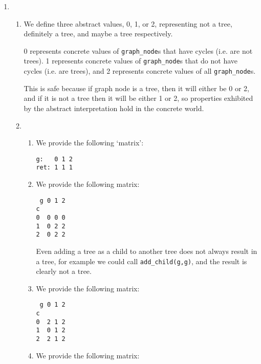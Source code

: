 


\begin{enumerate}[label=(\alph*)]

  \item
    \begin{enumerate}[label=(\roman*)]

      \item
        We define three abstract values, 0, 1, or 2, representing not a tree, definitely a tree, and maybe a tree respectively.

        0 represents concrete values of \texttt{graph\_node}s that have cycles (i.e. are not trees). 1 represents concrete values of \texttt{graph\_node}s that do not have cycles (i.e. are trees), and 2 represents concrete values of all \texttt{graph\_node}s.

        This is safe because if graph node is a tree, then it will either be 0 or 2, and if it is not a tree then it will be either 1 or 2, so properties exhibited by the abstract interpretation hold in the concrete world.

        \item
          \begin{enumerate}[label=(\Alph*)]

            \item

              We provide the following `matrix':

\begin{verbatim}
g:   0 1 2
ret: 1 1 1
\end{verbatim}

\item
  We provide the following matrix:

\begin{verbatim}
 g 0 1 2
c  
0  0 0 0
1  0 2 2
2  0 2 2
\end{verbatim}

Even adding a tree as a child to another tree does not always result in a tree, for example we could call \texttt{add\_child(g,g)}, and the result is clearly not a tree.

\item
  We provide the following matrix:

\begin{verbatim}
 g 0 1 2
c
0  2 1 2
1  0 1 2
2  2 1 2
\end{verbatim}

\item
   We provide the following matrix:


\end{enumerate}
\end{enumerate}
\end{enumerate}
